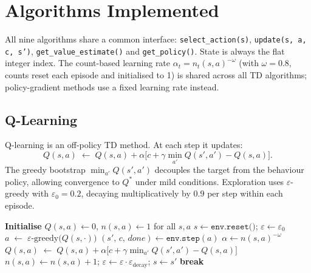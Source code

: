 \documentclass[11pt]{article}
\begin{document}
\section{Algorithms Implemented}

All nine algorithms share a common interface: \texttt{select\_action(s)},
\texttt{update(s,\,a,\,c,\,s')}, \texttt{get\_value\_estimate()} and
\texttt{get\_policy()}.  State is always the flat integer index.  The
count-based learning rate $\alpha_t = n_t(s,a)^{-\omega}$ (with $\omega=0.8$,
counts reset each episode and initialised to 1) is shared across all TD
algorithms; policy-gradient methods use a fixed learning rate instead.

\subsection{Q-Learning}

Q-learning is an off-policy TD method.  At each step it updates:
\begin{equation}
    Q(s,a) \;\leftarrow\; Q(s,a) + \alpha\bigl[c + \gamma\min_{a'}Q(s',a') - Q(s,a)\bigr].
\end{equation}
The greedy bootstrap $\min_{a'}Q(s',a')$ decouples the target from the
behaviour policy, allowing convergence to $Q^*$ under mild conditions.
Exploration uses $\varepsilon$-greedy with $\varepsilon_0=0.2$, decaying
multiplicatively by $0.9$ per step within each episode.

\begin{algorithm}[H]
\caption{Q-Learning}
\label{alg:qlearning}
\begin{algorithmic}[1]
\State \textbf{Initialise} $Q(s,a)\leftarrow 0$,\; $n(s,a)\leftarrow 1$ \quad for all $s,a$
    \State $s \leftarrow \texttt{env.reset()}$;\; $\varepsilon \leftarrow \varepsilon_0$
        \State $a \;\leftarrow\; \varepsilon\text{-greedy}\bigl(Q(s,\cdot)\bigr)$
        \State $(s',\, c,\, \textit{done}) \leftarrow \texttt{env.step}(a)$
        \State $\alpha \leftarrow n(s,a)^{-\omega}$
        \State $Q(s,a) \;\leftarrow\; Q(s,a) + \alpha\bigl[c + \gamma\min_{a'}Q(s',a') - Q(s,a)\bigr]$
        \State $n(s,a)\leftarrow n(s,a)+1$;\; $\varepsilon\leftarrow\varepsilon\cdot\varepsilon_{\text{decay}}$;\; $s\leftarrow s'$
         \textbf{break} \EndIf
    \EndFor
\EndFor
\end{algorithmic}
\end{algorithm}
\end{document}
